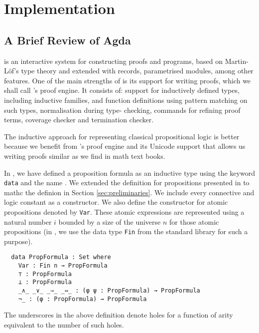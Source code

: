 \documentclass[../main.tex]{subfiles}
\begin{document}

\section{Implementation}
\label{sec:implementation}


\subsection{A Brief Review of Agda}
\label{ssec:agda-definition}

\Agda is an interactive system for constructing proofs and programs,
based on Martin-L\"{o}f's type theory and extended with records,
parametrised modules, among other features. One of the main
strengths of \Agda is its support for writing proofs, which we shall
call \Agda's proof engine. It consists of: support for inductively
defined types, including inductive families, and function
definitions using pattern matching on such types, normalisation
during type- checking, commands for refining proof terms, coverage
checker and termination checker.

The inductive approach for representing classical propositional
logic is better because we benefit from \Agda's proof engine and its
Unicode support that allows us writing proofs similar as we find in
math text books.

In \Agda, we have defined a proposition formula
as an inductive type using the keyword \texttt{data} and the name
.
We extended the definition for propositions presented in
\cite{Altenkirch2015} to mathc the definion in Section
\ref{sec:preliminaries}.
We include every connective and logic constant as a constructor.
We also define the constructor for atomic propositions denoted by
\verb!Var!. These atomic expressions are represented using a natural
number $i$ bounded by a size of the universe $n$ for those atomic
propositions (in \Agda, we use the data type \verb!Fin! from the
standard  library for such a purpose).

\begin{verbatim}
  data PropFormula : Set where
    Var : Fin n → PropFormula
    ⊤ : PropFormula
    ⊥ : PropFormula
    _∧_ _∨_ _⇒_ _⇔_ : (φ ψ : PropFormula) → PropFormula
    ¬_ : (φ : PropFormula) → PropFormula
\end{verbatim}

\begin{myremark}
The underscores in the above definition denote holes for a function of arity equivalent to the number of such holes.
\end{myremark}
\end{document}
